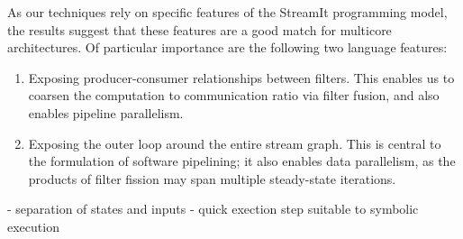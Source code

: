 As our techniques rely on specific features of the StreamIt
programming model, the results suggest that these features are a good
match for multicore architectures.  Of particular importance are the
following two language features:
\begin{enumerate}
\item Exposing producer-consumer relationships between filters.  This
enables us to coarsen the computation to communication ratio via
filter fusion, and also enables pipeline parallelism.

\item Exposing the outer loop around the entire stream graph.  This is
central to the formulation of software pipelining; it also enables
data parallelism, as the products of filter fission may span multiple
steady-state iterations.
\end{enumerate}

- separation of states and inputs
- quick exection step suitable to symbolic execution


